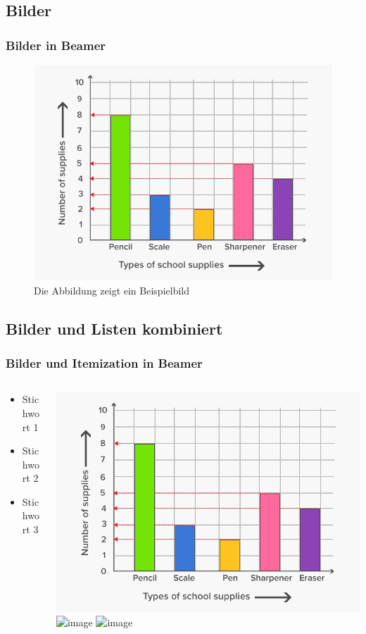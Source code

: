 \documentclass[handout]{beamer} %
\begin{document}
	\subsection{Bilder} 
	\begin{frame}\frametitle{Bilder in Beamer}
		\begin{figure}
			\includegraphics[scale=0.3]{PIC1} 
			\caption{Die Abbildung zeigt ein Beispielbild}
		\end{figure}
	\end{frame}
	
	
	\subsection{Bilder und Listen kombiniert} 
	
	\begin{frame}
		\frametitle{Bilder und Itemization in Beamer}
		\begin{columns}
			\begin{column}{5cm}
				\begin{itemize}
					\item<1-> Stichwort 1
					\item<3-> Stichwort 2
					\item<5-> Stichwort 3
				\end{itemize}
				\vspace{3cm} 
			\end{column}
			\begin{column}{5cm}
				\begin{overprint}
					\includegraphics<2>[scale=0.1]{PIC1}
					\includegraphics<4>[scale=0.1]{PIC2}
					\includegraphics<6>[scale=0.1]{PIC3}
				\end{overprint}
			\end{column}
		\end{columns}
	\end{frame}
	
\end{document}
